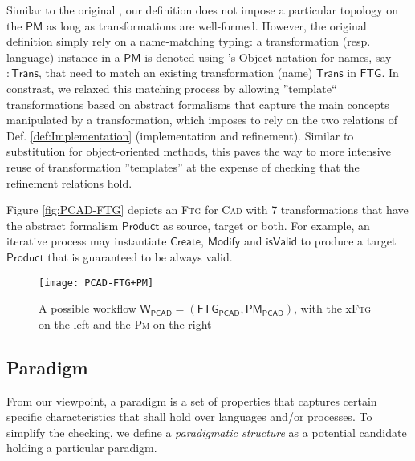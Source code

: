 Similar to the original  
\cite{Mustafiz-etAl:2012,Lucio-Mustafiz-etAl:2013,TR:Lucio-Mustafiz-etAl:2012},
our definition does not impose a particular topology on the $\mathsf{PM}$ as 
long as transformations are well-formed. However, the original definition 
simply rely on a name-matching typing: a transformation (resp. language) 
instance in a $\mathsf{PM}$ is denoted using \UML's Object notation for names, 
say $\mathsf{:Trans}$, that need to match an existing transformation (name) 
$\mathsf{Trans}$ in $\mathsf{FTG}$. In constrast, we relaxed this matching 
process by allowing ''template`` transformations based on abstract formalisms 
that capture the main concepts manipulated by a transformation, which imposes 
to rely on the two relations of Def. \ref{def:Implementation} (implementation 
and refinement). Similar to substitution for object-oriented methods, this 
paves the way to more intensive reuse of transformation ''templates'' at the 
expense of checking that the refinement relations hold.

\begin{Example}
   Figure \ref{fig:PCAD-FTG} depicts an \textsc{Ftg} for \textsc{Cad} with 7 
transformations that have the abstract formalism $\mathsf{Product}$ as source, 
target or both. For example, an iterative process may instantiate 
$\mathsf{Create}$, $\mathsf{Modify}$ and $\mathsf{isValid}$ to produce a target 
$\mathsf{Product}$ that is guaranteed to be always valid.  

\begin{figure}[t]
   \centering
   \texttt{[image: PCAD-FTG+PM]}
   \caption{A possible workflow $\mathsf{W_{PCAD}} = (\mathsf{FTG_{PCAD}}, 
\mathsf{PM_{PCAD}})$, with the x\textsc{Ftg} on the left and the \textsc{Pm} 
on the right}%
   \label{fig:PCAD-MM}%
\end{figure}
\end{Example}



\subsection{Paradigm}
\label{sec:PS}

From our viewpoint, a paradigm is a set of properties that captures 
certain specific characteristics that shall hold over languages and/or 
processes. To simplify the checking, we define a \emph{paradigmatic structure} 
as a potential candidate holding a particular paradigm.

